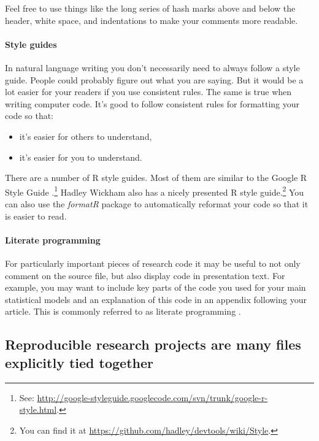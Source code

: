 {\noindent Feel free to use things like the long series of hash marks above and below the header, white space, and indentations to make your comments more readable. 

\paragraph{Style guides}
In natural language writing you don't necessarily need to always follow a style guide. People could probably figure out what you are saying. But it would be a lot easier for your readers if you use consistent rules. The same is true when writing computer code. It's good to follow consistent rules for formatting your code so that:

\begin{itemize}
    \item it's easier for others to understand,
    \item it's easier for you to understand.
\end{itemize}

There are a number of R style guides. Most of them are similar to the Google R Style Guide .\footnote{See: \url{http://google-styleguide.googlecode.com/svn/trunk/google-r-style.html}.} Hadley Wickham also has a nicely presented R style guide.\footnote{You can find it at \url{https://github.com/hadley/devtools/wiki/Style}.} You can also use the {\emph{formatR}} \cite[]{R-formatR} package to automatically reformat your code so that it is easier to read.

\paragraph{Literate programming}

For particularly important pieces of research code it may be useful to not only comment on the source file, but also display code in presentation text. For example, you may want to include key parts of the code you used for your main statistical models and an explanation of this code in an appendix following your article. This is commonly referred to as literate programming  \cite[]{Knuth1992}. 

\subsection{Reproducible research projects are many files explicitly tied together}

}
